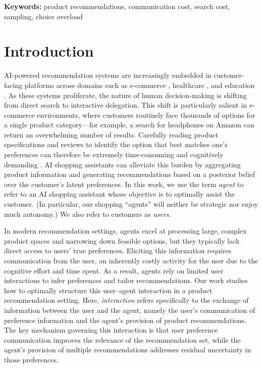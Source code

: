 \documentclass[12pt]{article}
\theoremstyle{definition}
\theoremstyle{remark}
\begin{document}
\noindent\textbf{Keywords:} product recommendations, communication cost, search cost, sampling, choice overload

\bigskip

\section{Introduction}
AI-powered recommendation systems are increasingly embedded in customer-facing platforms across domains such as e-commerce \citep{bansal2025magentic, cui2017superagent}, healthcare \citep{moor2023foundation, jiang2017artificial, yu2018artificial}, and education \citep{kasneci2023chatgpt, atchley2024human}. As these systems proliferate, the nature of human decision-making is shifting from direct search to interactive delegation. This shift is particularly salient in e-commerce environments, where customers routinely face thousands of options for a single product category—for example, a search for headphones on Amazon can return an overwhelming number of results. Carefully reading product specifications and reviews to identify the option that best matches one's preferences can therefore be extremely time-consuming and cognitively demanding \citep{schwartz2015paradox, scheibehenne2010can}. AI shopping assistants can alleviate this burden by aggregating product information and generating recommendations based on a posterior belief over the customer's latent preferences. In this work, we use the term \textit{agent} to refer to an AI shopping assistant whose objective is to optimally assist the customer. (In particular, our shopping ``agents'' will neither be strategic nor enjoy much autonomy.) We also refer to customers as \textit{users}.

In modern recommendation settings, agents excel at processing large, complex product spaces and narrowing down feasible options, but they typically lack direct access to users’ true preferences. Eliciting this information requires communication from the user, an inherently costly activity for the user due to the cognitive effort and time spent. As a result, agents rely on limited user interactions to infer preferences and tailor recommendations. Our work studies how to optimally structure this user–agent interaction in a product recommendation setting. Here, \textit{interaction} refers specifically to the exchange of information between the user and the agent, namely the user’s communication of preference information and the agent’s provision of product recommendations. The key mechanism governing this interaction is that user preference communication improves the relevance of the recommendation set, while the agent’s provision of multiple recommendations addresses residual uncertainty in those preferences.
\end{document}
